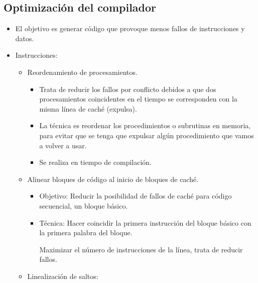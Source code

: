 \documentclass[12pt, twoside, openright]{report} %
\begin{document}
  \subsection{Optimización del compilador}

    \begin{itemize}
    
    \item
      El objetivo es generar código que provoque menos fallos de
      instrucciones y datos.
    \item
      Instrucciones:

      \begin{itemize}
      
      \item
        Reordenamiento de procesamientos.

        \begin{itemize}
        
        \item
          Trata de reducir los fallos por conflicto debidos a que dos
          procesamientos coincidentes en el tiempo se corresponden con
          la misma línea de caché (expulsa).
        \item
          La técnica es reordenar los procedimientos o subrutinas en
          memoria, para evitar que se tenga que expulsar algún
          procedimiento que vamos a volver a usar.
        \item
          Se realiza en tiempo de compilación.
        \end{itemize}
      \item
        Alinear bloques de código al inicio de bloques de caché.

        \begin{itemize}
        
        \item
          Objetivo: Reducir la posibilidad de fallos de caché para
          código secuencial, un bloque básico.
        \item
          Técnica: Hacer coincidir la primera instrucción del bloque
          básico con la primera palabra del bloque.

          
          
            Maximizar el número de instrucciones de la línea, trata de
            reducir fallos.

          \end{itemize}
      \item
        Linealización de saltos:


\end{itemize}
\end{itemize}
\end{document}
